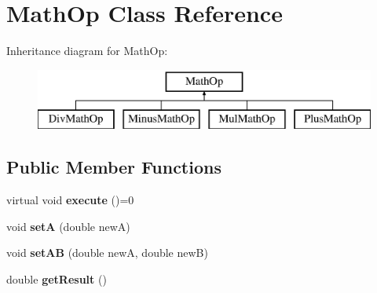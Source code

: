 \hypertarget{class_math_op}{}\section{Math\+Op Class Reference}
\label{class_math_op}
Inheritance diagram for Math\+Op\+:\begin{figure}[H]
\begin{center}
\leavevmode
\includegraphics[height=2.000000cm]{class_math_op}
\end{center}
\end{figure}
\subsection*{Public Member Functions}
\begin{DoxyCompactItemize}
\item 
\hypertarget{class_math_op_a7eb54cf02054e4c65afd93f0e1f54833}{}virtual void {\bfseries execute} ()=0\label{class_math_op_a7eb54cf02054e4c65afd93f0e1f54833}

\item 
\hypertarget{class_math_op_aaf00128f671302d984bb32e488229616}{}void {\bfseries set\+A} (double new\+A)\label{class_math_op_aaf00128f671302d984bb32e488229616}

\item 
\hypertarget{class_math_op_a99e27af1ed722c942d4018b7384b0dff}{}void {\bfseries set\+A\+B} (double new\+A, double new\+B)\label{class_math_op_a99e27af1ed722c942d4018b7384b0dff}

\item 
\hypertarget{class_math_op_a45e51beba01736ca71ccd641eec4b433}{}double {\bfseries get\+Result} ()\label{class_math_op_a45e51beba01736ca71ccd641eec4b433}

\end{DoxyCompactItemize}
